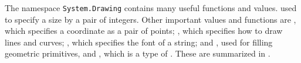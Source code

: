\documentclass[fsharpnotes.tex]{subfiles}
\begin{document}
The namespace \lstinline{System.Drawing} contains many useful functions and values.  used  to specify a size by a pair of integers. Other important values and functions are  , which specifies a coordinate as a pair of points; , which specifies how to draw lines and curves; , which specifies the font of a string;  and , used for filling geometric primitives, and , which is a type of . These are summarized in .
\end{document}
